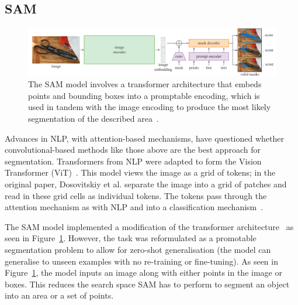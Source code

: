 \documentclass[12pt,twoside]{report}
\begin{document}




\subsection{SAM}\label{sect:sam}

\begin{figure}
  \centering
  \includegraphics[width=1\linewidth]{../figures/SAM.png}
  \caption{The SAM model involves a transformer architecture that embeds points and bounding boxes into a promptable encoding, which is used in tandem with the image encoding to produce the most likely segmentation of the described area~\cite{SAM}.}\label{fig:sam}
\end{figure}

Advances in NLP, with attention-based mechanisms, have questioned whether convolutional-based methods like those above are the best approach for segmentation. Transformers from NLP were adapted to form the Vision Transformer (ViT)~\cite{ViT}. This model views the image as a grid of tokens; in the original paper, Dosovitskiy et al. separate the image into a grid of patches and read in these grid cells as individual tokens. The tokens pass through the attention mechanism as with NLP and into a classification mechanism~\cite{ViT}. 

The SAM model implemented a modification of the transformer architecture~\cite{SAM} as seen in Figure~\ref{fig:sam}. However, the task was reformulated as a promotable segmentation problem to allow for zero-shot generalisation (the model can generalise to unseen examples with no re-training or fine-tuning). As seen in Figure~\ref{fig:sam}, the model inputs an image along with either points in the image or boxes. This reduces the search space SAM has to perform to segment an object into an area or a set of points.
\end{document}

